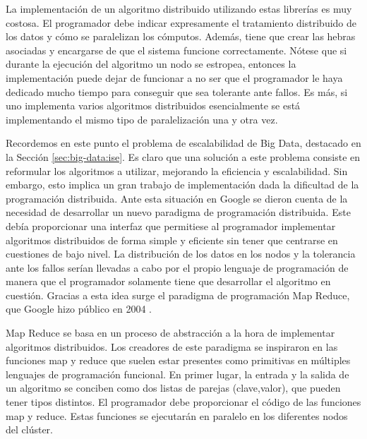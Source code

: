 \documentclass[10pt]{article}
\begin{document}
		La implementación de un algoritmo distribuido utilizando estas librerías es muy costosa. El programador debe indicar expresamente el tratamiento distribuido de los datos y cómo se paralelizan los cómputos. Además, tiene que crear las hebras asociadas y encargarse de que el sistema funcione correctamente. Nótese que si durante la ejecución del algoritmo un nodo se estropea, entonces la implementación puede dejar de funcionar a no ser que el programador le haya dedicado mucho tiempo para conseguir que sea tolerante ante fallos. Es más, si uno implementa varios algoritmos distribuidos esencialmente se está implementando el mismo tipo de paralelización una y otra vez.
	
		Recordemos en este punto el problema de escalabilidad de Big Data, destacado en la Sección \ref{sec:big-data:ise}. Es claro que una solución a este problema consiste en reformular los algoritmos a utilizar, mejorando la eficiencia y escalabilidad. Sin embargo, esto implica un gran trabajo de implementación dada la dificultad de la programación distribuida. Ante esta situación en Google se dieron cuenta de la necesidad de desarrollar un nuevo paradigma de programación distribuida. Este debía proporcionar una interfaz que permitiese al programador implementar algoritmos distribuidos de forma simple y eficiente sin tener que centrarse en cuestiones de bajo nivel. La distribución de los datos en los nodos y la tolerancia ante los fallos serían llevadas a cabo por el propio lenguaje de programación de manera que el programador solamente tiene que desarrollar el algoritmo en cuestión. Gracias a esta idea surge el paradigma de programación Map Reduce, que Google hizo público en 2004 \cite{map-reduce1, map-reduce2, map-reduce3}.
	
		Map Reduce se basa en un proceso de abstracción a la hora de implementar algoritmos distribuidos. Los creadores de este paradigma se inspiraron en las funciones map y reduce que suelen estar presentes como primitivas en múltiples lenguajes de programación funcional. En primer lugar, la entrada y la salida de un algoritmo se conciben como dos listas de parejas (clave,valor), que pueden tener tipos distintos. El programador debe proporcionar el código de las funciones map y reduce. Estas funciones se ejecutarán en paralelo en los diferentes nodos del clúster.
		
\end{document}
